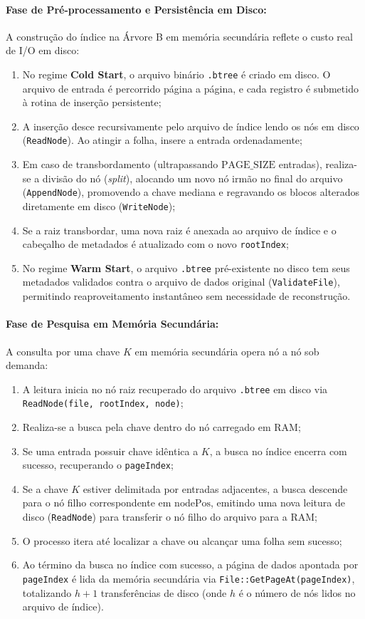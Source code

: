 \documentclass[12pt,a4paper]{article}
\begin{document}
\paragraph{Fase de Pré-processamento e Persistência em Disco:}
A construção do índice na Árvore B em memória secundária reflete o custo real de I/O em disco:
\begin{enumerate}
    \item No regime \textbf{Cold Start}, o arquivo binário \texttt{.btree} é criado em disco. O arquivo de entrada é percorrido página a página, e cada registro é submetido à rotina de inserção persistente;
    \item A inserção desce recursivamente pelo arquivo de índice lendo os nós em disco (\texttt{ReadNode}). Ao atingir a folha, insere a entrada ordenadamente;
    \item Em caso de transbordamento (ultrapassando $\text{PAGE\_SIZE}$ entradas), realiza-se a divisão do nó (\textit{split}), alocando um novo nó irmão no final do arquivo (\texttt{AppendNode}), promovendo a chave mediana e regravando os blocos alterados diretamente em disco (\texttt{WriteNode});
    \item Se a raiz transbordar, uma nova raiz é anexada ao arquivo de índice e o cabeçalho de metadados é atualizado com o novo \texttt{rootIndex};
    \item No regime \textbf{Warm Start}, o arquivo \texttt{.btree} pré-existente no disco tem seus metadados validados contra o arquivo de dados original (\texttt{ValidateFile}), permitindo reaproveitamento instantâneo sem necessidade de reconstrução.
\end{enumerate}

\paragraph{Fase de Pesquisa em Memória Secundária:}
A consulta por uma chave $K$ em memória secundária opera nó a nó sob demanda:
\begin{enumerate}
    \item A leitura inicia no nó raiz recuperado do arquivo \texttt{.btree} em disco via \texttt{ReadNode(file, rootIndex, node)};
    \item Realiza-se a busca pela chave dentro do nó carregado em RAM;
    \item Se uma entrada possuir chave idêntica a $K$, a busca no índice encerra com sucesso, recuperando o \texttt{pageIndex};
    \item Se a chave $K$ estiver delimitada por entradas adjacentes, a busca descende para o nó filho correspondente em $\text{nodePos}$, emitindo uma nova leitura de disco (\texttt{ReadNode}) para transferir o nó filho do arquivo para a RAM;
    \item O processo itera até localizar a chave ou alcançar uma folha sem sucesso;
    \item Ao término da busca no índice com sucesso, a página de dados apontada por \texttt{pageIndex} é lida da memória secundária via \texttt{File::GetPageAt(pageIndex)}, totalizando $h + 1$ transferências de disco (onde $h$ é o número de nós lidos no arquivo de índice).
\end{enumerate}
\end{document}
